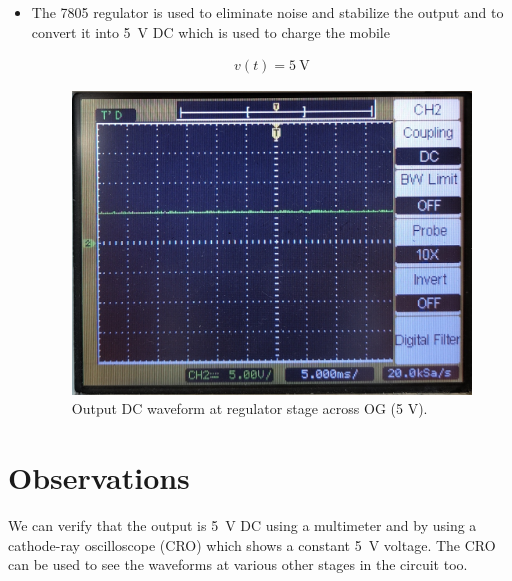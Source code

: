 \documentclass[journal,12pt,twocolumn]{IEEEtran}
\numberwithin{equation}{section}
\numberwithin{figure}{section}
\begin{document}
\begin{itemize}
	\item The 7805 regulator is used to eliminate noise and stabilize the output and to convert it into \SI{5}{\volt} DC which is used to charge the mobile
	
	\begin{align}
		v(t) = \SI{5}{\volt}
	\end{align}
	
	\begin{figure}[!ht]
		\centering
		\includegraphics[width=\columnwidth]{./figs/regulator_dc.jpg}
		\caption{Output DC waveform at regulator stage across OG (5 V).}
		\label{fig-regulator}	
	\end{figure}
	\end{itemize}
	
	\section{Observations}
	We can verify that the output is \SI{5}{\volt} DC using a multimeter and by using a cathode-ray oscilloscope (CRO) which shows a constant \SI{5}{\volt} voltage. The CRO can be used to see the waveforms at various other stages in the circuit too.

	
	
\end{document}
